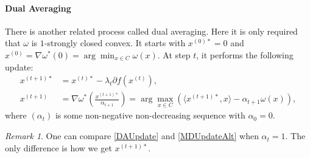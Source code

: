 \documentclass[openany]{book}
\theoremstyle{definition}
\theoremstyle{remark}
\newtheorem*{remark}{Remark}
\begin{document}
\paragraph{Dual Averaging}
There is another related process called dual averaging. Here it is only required that $\omega$ is $1$-strongly closed convex. It starts with $x^{(0)*}=0$ and $x^{(0)}=\nabla\omega^*(0)=\arg\min_{x\in C}\omega(x)$. At step $t$, it performs the following update:
\begin{equation}\label{DAUpdate}
    \begin{split}
        x^{(t+1)*} & =x^{(t)*}-\lambda_t\partial f(x^{(t)}), \\
        x^{(t+1)} & =\nabla\omega^*\left(\frac{x^{(t+1)*}}{\alpha_{t+1}}\right)=\arg\max_{x\in C}\left(\langle x^{(t+1)*},x\rangle-\alpha_{t+1}\omega(x)\right),
    \end{split}
\end{equation}
where $(\alpha_t)$ is some non-negative non-decreasing sequence with $\alpha_0=0$.
\begin{remark}
    One can compare \eqref{DAUpdate} and \eqref{MDUpdateAlt} when $\alpha_t=1$. The only difference is how we get $x^{(t+1)*}$.
\end{remark}
\end{document}
